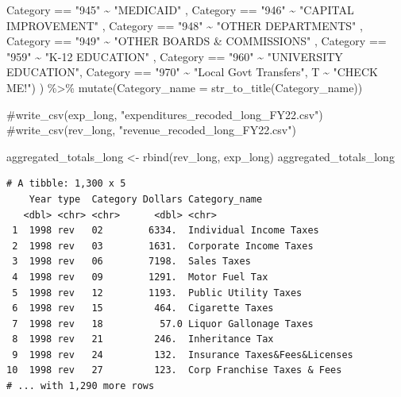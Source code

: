 \documentclass[
  letterpaper,
  DIV=11,
  numbers=noendperiod]{scrreport}
\newenvironment{Shaded}{\begin{snugshade}}{\end{snugshade}}
\newcommand{\AttributeTok}[1]{\textcolor[rgb]{0.40,0.45,0.13}{#1}}
\newcommand{\CommentTok}[1]{\textcolor[rgb]{0.37,0.37,0.37}{#1}}
\newcommand{\FunctionTok}[1]{\textcolor[rgb]{0.28,0.35,0.67}{#1}}
\newcommand{\NormalTok}[1]{\textcolor[rgb]{0.00,0.23,0.31}{#1}}
\newcommand{\OtherTok}[1]{\textcolor[rgb]{0.00,0.23,0.31}{#1}}
\newcommand{\SpecialCharTok}[1]{\textcolor[rgb]{0.37,0.37,0.37}{#1}}
\newcommand{\StringTok}[1]{\textcolor[rgb]{0.13,0.47,0.30}{#1}}
\begin{document}
\begin{Shaded}
\begin{Highlighting}[]
\NormalTok{             Category }\SpecialCharTok{==} \StringTok{"945"} \SpecialCharTok{\textasciitilde{}} \StringTok{"MEDICAID"}\NormalTok{ ,}
\NormalTok{             Category }\SpecialCharTok{==} \StringTok{"946"} \SpecialCharTok{\textasciitilde{}} \StringTok{"CAPITAL IMPROVEMENT"}\NormalTok{ , }
\NormalTok{             Category }\SpecialCharTok{==} \StringTok{"948"} \SpecialCharTok{\textasciitilde{}} \StringTok{"OTHER DEPARTMENTS"}\NormalTok{ ,}
\NormalTok{             Category }\SpecialCharTok{==} \StringTok{"949"} \SpecialCharTok{\textasciitilde{}} \StringTok{"OTHER BOARDS \& COMMISSIONS"}\NormalTok{ ,}
\NormalTok{             Category }\SpecialCharTok{==} \StringTok{"959"} \SpecialCharTok{\textasciitilde{}} \StringTok{"K{-}12 EDUCATION"}\NormalTok{ ,}
\NormalTok{             Category }\SpecialCharTok{==} \StringTok{"960"} \SpecialCharTok{\textasciitilde{}} \StringTok{"UNIVERSITY EDUCATION"}\NormalTok{,}
\NormalTok{             Category }\SpecialCharTok{==} \StringTok{"970"} \SpecialCharTok{\textasciitilde{}} \StringTok{"Local Govt Transfers"}\NormalTok{,}
\NormalTok{             T }\SpecialCharTok{\textasciitilde{}} \StringTok{"CHECK ME!"}\NormalTok{)}
\NormalTok{           ) }\SpecialCharTok{\%\textgreater{}\%} 
  \FunctionTok{mutate}\NormalTok{(}\AttributeTok{Category\_name =} \FunctionTok{str\_to\_title}\NormalTok{(Category\_name))}

\CommentTok{\#write\_csv(exp\_long, "expenditures\_recoded\_long\_FY22.csv")}
\CommentTok{\#write\_csv(rev\_long, "revenue\_recoded\_long\_FY22.csv")}

\NormalTok{aggregated\_totals\_long }\OtherTok{\textless{}{-}} \FunctionTok{rbind}\NormalTok{(rev\_long, exp\_long)}
\NormalTok{aggregated\_totals\_long}
\end{Highlighting}
\end{Shaded}

\begin{verbatim}
# A tibble: 1,300 x 5
    Year type  Category Dollars Category_name                
   <dbl> <chr> <chr>      <dbl> <chr>                        
 1  1998 rev   02        6334.  Individual Income Taxes      
 2  1998 rev   03        1631.  Corporate Income Taxes       
 3  1998 rev   06        7198.  Sales Taxes                  
 4  1998 rev   09        1291.  Motor Fuel Tax               
 5  1998 rev   12        1193.  Public Utility Taxes         
 6  1998 rev   15         464.  Cigarette Taxes              
 7  1998 rev   18          57.0 Liquor Gallonage Taxes       
 8  1998 rev   21         246.  Inheritance Tax              
 9  1998 rev   24         132.  Insurance Taxes&Fees&Licenses
10  1998 rev   27         123.  Corp Franchise Taxes & Fees  
# ... with 1,290 more rows
\end{verbatim}
\end{document}

